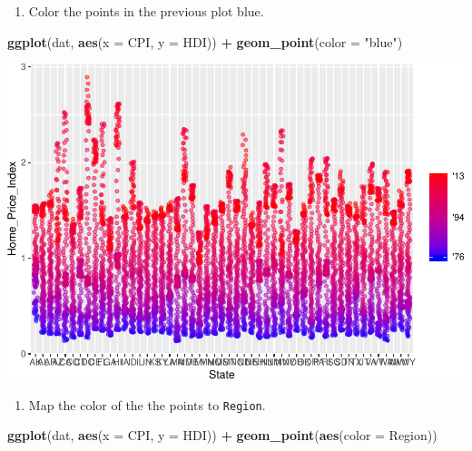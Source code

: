 \documentclass[
]{book}
\newenvironment{Shaded}{\begin{snugshade}}{\end{snugshade}}
\newcommand{\DataTypeTok}[1]{\textcolor[rgb]{0.13,0.29,0.53}{#1}}
\newcommand{\KeywordTok}[1]{\textcolor[rgb]{0.13,0.29,0.53}{\textbf{#1}}}
\newcommand{\NormalTok}[1]{#1}
\newcommand{\OperatorTok}[1]{\textcolor[rgb]{0.81,0.36,0.00}{\textbf{#1}}}
\newcommand{\StringTok}[1]{\textcolor[rgb]{0.31,0.60,0.02}{#1}}
\providecommand{\tightlist}{%
  \setlength{\itemsep}{0pt}\setlength{\parskip}{0pt}}
\begin{document}
\begin{enumerate}
\def\labelenumi{\arabic{enumi}.}
\setcounter{enumi}{1}
\tightlist
\item
  Color the points in the previous plot blue.
\end{enumerate}

\begin{Shaded}
\begin{Highlighting}[]
\KeywordTok{ggplot}\NormalTok{(dat, }\KeywordTok{aes}\NormalTok{(}\DataTypeTok{x =}\NormalTok{ CPI, }\DataTypeTok{y =}\NormalTok{ HDI)) }\OperatorTok{+}
\StringTok{  }\KeywordTok{geom\_point}\NormalTok{(}\DataTypeTok{color =} \StringTok{"blue"}\NormalTok{)}
\end{Highlighting}
\end{Shaded}

\includegraphics{R/Rgraphics/figures/unnamed-chunk-175-1.pdf}

\begin{enumerate}
\def\labelenumi{\arabic{enumi}.}
\setcounter{enumi}{2}
\tightlist
\item
  Map the color of the the points to \texttt{Region}.
\end{enumerate}

\begin{Shaded}
\begin{Highlighting}[]
\KeywordTok{ggplot}\NormalTok{(dat, }\KeywordTok{aes}\NormalTok{(}\DataTypeTok{x =}\NormalTok{ CPI, }\DataTypeTok{y =}\NormalTok{ HDI)) }\OperatorTok{+}
\StringTok{  }\KeywordTok{geom\_point}\NormalTok{(}\KeywordTok{aes}\NormalTok{(}\DataTypeTok{color =}\NormalTok{ Region))}
\end{Highlighting}
\end{Shaded}
\end{document}
